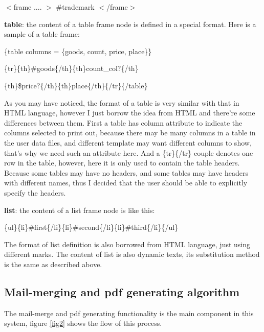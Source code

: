 \documentclass{report}
\begin{document}
  $<$frame .... $>$ \#trademark $<$/frame$>$

  \textbf{table}: the content of a table frame node is defined in a special format. Here is a sample of a table frame:

\{table columns = \{goods, count, price, place\}\}

\{tr\}\{th\}\#goods\{/th\}\{th\}count\_col?\{/th\}

\{th\}\$price?\{/th\}\{th\}place\{/th\}\{/tr\}\{/table\}

  As you may have noticed, the format of a table is very similar with that in HTML language, however I just borrow the idea from HTML and there're some differences between them. First a table has column attribute to indicate the columns selected to print out, because there may be many columns in a table in the user data files, and different template may want different columns to show, that's why we need such an attribute here. And a \{tr\}\{/tr\} couple denotes one row in the table, however, here it is only used to contain the table headers. Because some tables may have no headers, and some tables may have headers with different names, thus I decided that the user should be able to explicitly specify the headers. 

  \textbf{list}: the content of a list frame node is like this:

\{ul\}\{li\}\#first\{/li\}\{li\}\#second\{/li\}\{li\}\#third\{/li\}\{/ul\}

  The format of list definition is also borrowed from HTML language, just using different marks. The content of list is also dynamic texts, its substitution method is the same as described above. 
  
\subsection{Mail-merging and pdf generating algorithm}

  The mail-merge and pdf generating functionality is the main component in this system, figure \ref{fig2} shows the flow of this process. 
\end{document}
